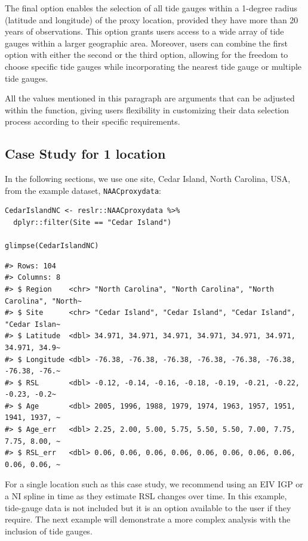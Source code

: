 The final option enables the selection of all tide gauges within a 1-degree radius (latitude and longitude) of the proxy location, provided they have more than 20 years of observations. This option grants users access to a wide array of tide gauges within a larger geographic area. Moreover, users can combine the first option with either the second or the third option, allowing for the freedom to choose specific tide gauges while incorporating the nearest tide gauge or multiple tide gauges.

All the values mentioned in this paragraph are arguments that can be adjusted within the function, giving users flexibility in customizing their data selection process according to their specific requirements.

\subsection{Case Study for 1 location}\label{casestudy1}

In the following sections, we use one site, Cedar Island, North Carolina, USA, from the example dataset, \texttt{NAACproxydata}:
\scriptsize

\begin{verbatim}
CedarIslandNC <- reslr::NAACproxydata %>% 
  dplyr::filter(Site == "Cedar Island")

glimpse(CedarIslandNC)
\end{verbatim}

\begin{verbatim}
#> Rows: 104
#> Columns: 8
#> $ Region    <chr> "North Carolina", "North Carolina", "North Carolina", "North~
#> $ Site      <chr> "Cedar Island", "Cedar Island", "Cedar Island", "Cedar Islan~
#> $ Latitude  <dbl> 34.971, 34.971, 34.971, 34.971, 34.971, 34.971, 34.971, 34.9~
#> $ Longitude <dbl> -76.38, -76.38, -76.38, -76.38, -76.38, -76.38, -76.38, -76.~
#> $ RSL       <dbl> -0.12, -0.14, -0.16, -0.18, -0.19, -0.21, -0.22, -0.23, -0.2~
#> $ Age       <dbl> 2005, 1996, 1988, 1979, 1974, 1963, 1957, 1951, 1941, 1937, ~
#> $ Age_err   <dbl> 2.25, 2.00, 5.00, 5.75, 5.50, 5.50, 7.00, 7.75, 7.75, 8.00, ~
#> $ RSL_err   <dbl> 0.06, 0.06, 0.06, 0.06, 0.06, 0.06, 0.06, 0.06, 0.06, 0.06, ~
\end{verbatim}

\normalsize

For a single location such as this case study, we recommend using an EIV IGP or a NI spline in time as they estimate RSL changes over time. In this example, tide-gauge data is not included but it is an option available to the user if they require. The next example will demonstrate a more complex analysis with the inclusion of tide gauges.

